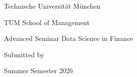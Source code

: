 \begin{titlepage}
    \centering
    \vspace*{3cm}

    {\Large Technische Universität München\par}
    \vspace{0.4cm}
    {\large TUM School of Management\par}

    \vspace{2cm}

    {\large Advanced Seminar Data Science in Finance\par}

    \vspace{1.5cm}

    {\huge\bfseries\@title\par}

    \vfill

    {\large
    Submitted by\par
    \vspace{0.3cm}
    \@author\par
    }

    \vfill

    {\large Summer Semester 2026\par}
\end{titlepage}
